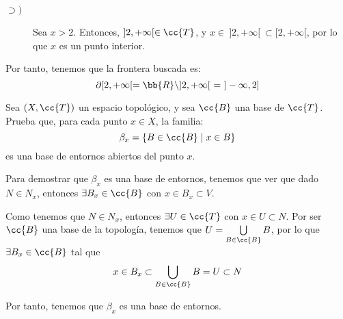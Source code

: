 \begin{ejercicio}
\begin{enumerate}[label=\alph*)]
\begin{description}
            \item[$\supset)$] Sea $x>2$. Entonces, $]2,+\infty[\in \cc{T}$, y $x\in~]2,+\infty[~\subset [2,+\infty[$, por lo que $x$ es un punto interior.
        \end{description}

        Por tanto, tenemos que la frontera buscada es:
        \begin{equation*}
            \partial [2,+\infty[ = \bb{R}\setminus ]2,+\infty[ ~=~]-\infty, 2]
        \end{equation*}
    \end{enumerate}
\end{ejercicio}


\begin{ejercicio}\label{Ej:3.1.18}
    Sea $(X,\cc{T})$ un espacio topológico, y sea $\cc{B}$ una base de $\cc{T}$. Prueba que, para cada punto $x\in X$, la familia:
    \begin{equation*}
        \beta_x = \{B\in \cc{B}\mid x \in B\}
    \end{equation*}
    es una base de entornos abiertos del punto $x$.

    Para demostrar que $\beta_x$ es una base de entornos, tenemos que ver que dado $N\in N_x$, entonces $\exists B_x\in \cc{B}$ con $x\in B_x\subset V$.

    Como tenemos que $N\in N_x$, entonces $\exists U\in  \cc{T}$ con $x\in U\subset N$. Por ser $\cc{B}$ una base de la topología, tenemos que $U=\bigcup\limits_{B\in \cc{B}}B$, por lo que $\exists B_x\in \cc{B}$ tal que $$x\in B_x\subset \bigcup\limits_{B\in \cc{B}}B=U\subset N$$

    Por tanto, tenemos que $\beta_x$ es una base de entornos.
\end{ejercicio}


